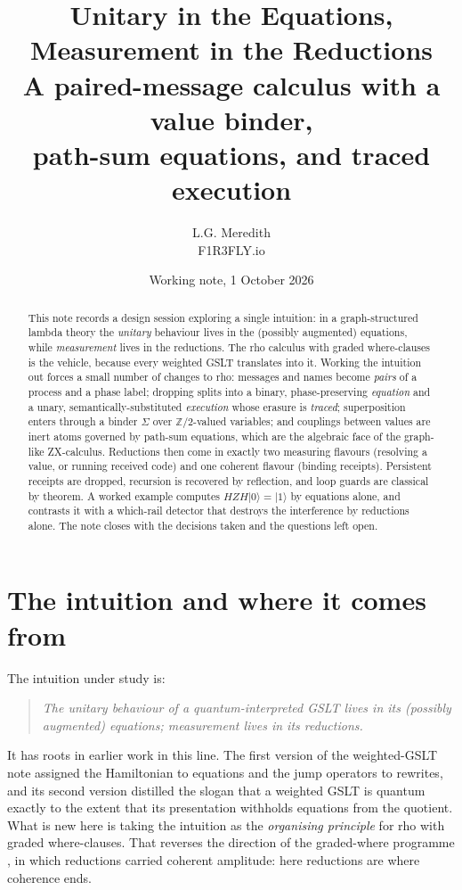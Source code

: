 \documentclass[11pt,a4paper]{article}
\title{Unitary in the Equations, Measurement in the Reductions\\[0.4em]
\large A paired-message \rhoc{} calculus with a value binder,\\
path-sum equations, and traced execution}
\author{L.G. Meredith\\ F1R3FLY.io}
\date{Working note, 1 October 2026}
\theoremstyle{plain}
\theoremstyle{definition}
\theoremstyle{remark}
\newcommand{\rhoc}{\textsf{rho}}
\newcommand{\ket}[1]{\lvert #1 \rangle}
\newcommand{\Zt}{\mathbb{Z}/2}
\begin{document}
\maketitle

\begin{abstract}
This note records a design session exploring a single intuition: in a
graph-structured lambda theory the \emph{unitary} behaviour lives in the
(possibly augmented) equations, while \emph{measurement} lives in the
reductions. The \rhoc{} calculus with graded where-clauses is the vehicle,
because every weighted GSLT translates into it. Working the intuition out
forces a small number of changes to \rhoc{}: messages and names become
\emph{pairs} of a process and a phase label; dropping splits into a binary,
phase-preserving \emph{equation} and a unary, semantically-substituted
\emph{execution} whose erasure is \emph{traced}; superposition enters through
a binder $\Sigma$ over $\Zt$-valued variables; and couplings between values are
inert atoms governed by path-sum equations, which are the algebraic face of the
graph-like ZX-calculus. Reductions then come in exactly two measuring flavours
(resolving a value, or running received code) and one coherent flavour
(binding receipts). Persistent receipts are dropped, recursion is recovered by
reflection, and loop guards are classical by theorem. A worked example computes
$HZH\ket{0} = \ket{1}$ by equations alone, and contrasts it with a
which-rail detector that destroys the interference by reductions alone. The
note closes with the decisions taken and the questions left open.
\end{abstract}

\tableofcontents

\section{The intuition and where it comes from}

The intuition under study is:

\begin{quote}
\emph{The unitary behaviour of a quantum-interpreted GSLT lives in its
(possibly augmented) equations; measurement lives in its reductions.}
\end{quote}

It has roots in earlier work in this line. The first version of the
weighted-GSLT note assigned the Hamiltonian to equations and the jump
operators to rewrites, and its second version distilled the slogan that a
weighted GSLT is quantum exactly to the extent that its presentation withholds
equations from the quotient. What is new here is taking the intuition as the
\emph{organising principle} for \rhoc{} with graded where-clauses. That
reverses the direction of the graded-where programme
\cite{GWv6}, in which reductions carried coherent amplitude: here reductions
are where coherence ends.
\end{document}
